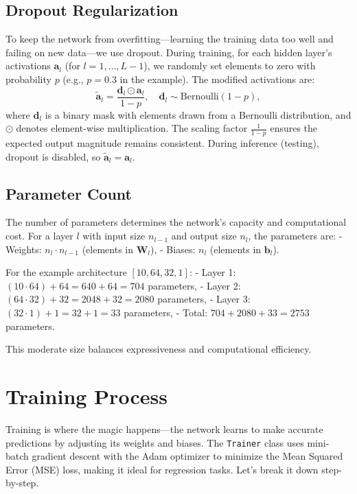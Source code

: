 \documentclass[11pt, a4paper]{article}
\begin{document}
\subsection{Dropout Regularization}
To keep the network from overfitting—learning the training data too well and failing on new data—we use dropout. During training, for each hidden layer’s activations $\mathbf{a}_l$ (for $l = 1, \dots, L-1$), we randomly set elements to zero with probability $p$ (e.g., $p=0.3$ in the example). The modified activations are:
\begin{equation}
    \tilde{\mathbf{a}}_l = \frac{\mathbf{d}_l \odot \mathbf{a}_l}{1-p}, \quad \mathbf{d}_l \sim \text{Bernoulli}(1-p), \label{eq:dropout}
\end{equation}
where $\mathbf{d}_l$ is a binary mask with elements drawn from a Bernoulli distribution, and $\odot$ denotes element-wise multiplication. The scaling factor $\frac{1}{1-p}$ ensures the expected output magnitude remains consistent. During inference (testing), dropout is disabled, so $\tilde{\mathbf{a}}_l = \mathbf{a}_l$.

\subsection{Parameter Count}
The number of parameters determines the network’s capacity and computational cost. For a layer $l$ with input size $n_{l-1}$ and output size $n_l$, the parameters are:
- Weights: $n_l \cdot n_{l-1}$ (elements in $\mathbf{W}_l$),
- Biases: $n_l$ (elements in $\mathbf{b}_l$).

For the example architecture $[10, 64, 32, 1]$:
- Layer 1: $(10 \cdot 64) + 64 = 640 + 64 = 704$ parameters,
- Layer 2: $(64 \cdot 32) + 32 = 2048 + 32 = 2080$ parameters,
- Layer 3: $(32 \cdot 1) + 1 = 32 + 1 = 33$ parameters,
- Total: $704 + 2080 + 33 = 2753$ parameters.

This moderate size balances expressiveness and computational efficiency.

\section{Training Process}
Training is where the magic happens—the network learns to make accurate predictions by adjusting its weights and biases. The \texttt{Trainer} class uses mini-batch gradient descent with the Adam optimizer to minimize the Mean Squared Error (MSE) loss, making it ideal for regression tasks. Let’s break it down step-by-step.
\end{document}
